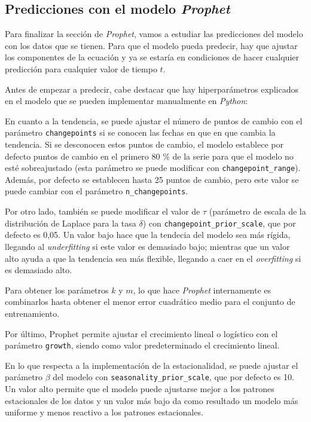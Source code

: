 \documentclass[12pt,twoside]{article}
\begin{document}
\subsection{Predicciones con el modelo \textit{Prophet}}\label{sec:7}

Para finalizar la sección de \textit{Prophet}, vamos a estudiar las predicciones del modelo con los datos que se tienen. Para que el modelo pueda predecir, hay que ajustar los componentes de la ecuación y ya se estaría en condiciones de hacer cualquier predicción para cualquier valor de tiempo $t$.

Antes de empezar a predecir, cabe destacar que hay hiperparámetros \cite{prophet2} explicados en el modelo que se pueden implementar manualmente en \textit{Python}:

En cuanto a la tendencia, se puede ajustar el número de puntos de cambio con el parámetro \texttt{changepoints} si se conocen las fechas en que en que cambia la tendencia. Si se desconocen estos puntos de cambio, el modelo establece por defecto puntos de cambio en el primero 80 \% de la serie para que el modelo no esté sobreajustado (esta parámetro se puede modificar con \texttt{changepoint\_range}). Además, por defecto se establecen hasta 25 puntos de cambio, pero este valor se puede cambiar con el parámetro \texttt{n\_changepoints}.

Por otro lado, también se puede modificar el valor de $\tau$ (parámetro de escala de la distribución de Laplace para la tasa $\delta$) con \texttt{changepoint\_prior\_scale}, que por defecto es 0,05. Un valor bajo hace que la tendecia del modelo sea más rígida, llegando al \textit{underfitting} si este valor es demasiado bajo; mientras que un valor alto ayuda a que la tendencia sea más flexible, llegando a caer en el \textit{overfitting} si es demasiado alto.

Para obtener los parámetros $k$ y $m$, lo que hace \textit{Prophet} internamente es combinarlos hasta obtener el menor error cuadrático medio para el conjunto de entrenamiento.

Por último, Prophet permite ajustar el crecimiento lineal o logístico con el parámetro \texttt{growth}, siendo como valor predeterminado el crecimiento lineal.

En lo que respecta a la implementación de la estacionalidad, se puede ajustar el parámetro $\beta$ del modelo con \texttt{seasonality\_prior\_scale}, que por defecto es 10. Un valor alto permite que el modelo puede ajustarse mejor a los patrones estacionales de los datos y un valor más bajo da como resultado un modelo más uniforme y menos reactivo a los patrones estacionales.
\end{document}
